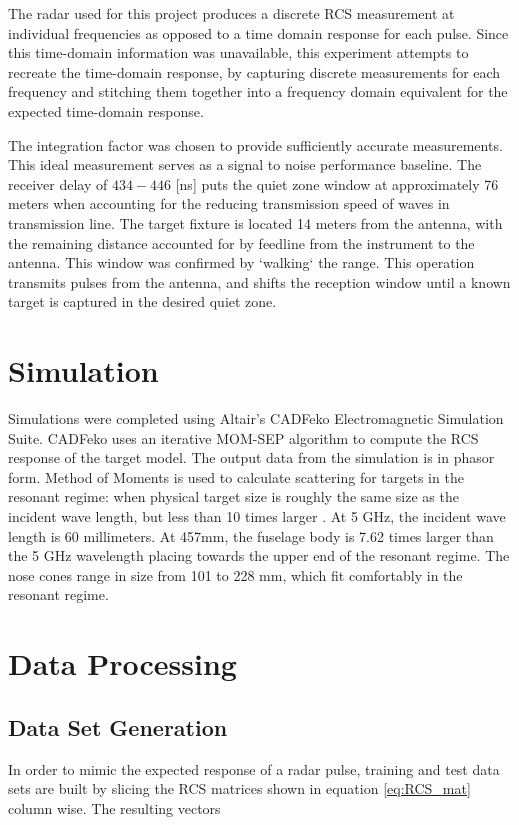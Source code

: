 
  The radar used for this project produces a discrete RCS measurement at individual frequencies as opposed to a time domain response for each pulse. Since this time-domain information was unavailable, this experiment attempts to recreate the time-domain response, by capturing discrete measurements for each frequency and stitching them together into a frequency domain equivalent for the expected time-domain response.

  The integration factor was chosen to provide sufficiently accurate measurements. This ideal measurement serves as a signal to noise performance baseline. The receiver delay of $434-446$ [ns] puts the quiet zone window at approximately 76 meters when accounting for the reducing transmission speed of waves in transmission line. The target fixture is located 14 meters from the antenna, with the remaining distance accounted for by feedline from the instrument to the antenna. This window was confirmed by `walking` the range. This operation transmits pulses from the antenna, and shifts the reception window until a known target is captured in the desired quiet zone.

\section{Simulation}

  Simulations were completed using Altair's CADFeko Electromagnetic Simulation Suite. CADFeko uses an iterative \gls{MOM-SEP} algorithm to compute the RCS response of the target model. The output data from the simulation is in phasor form. Method of Moments is used to calculate scattering for targets in the resonant regime:  when physical target size is roughly the same size as the incident wave length, but less than 10 times larger \cite{Knott}. At 5 GHz, the incident wave length is 60 millimeters. At 457mm, the fuselage body is 7.62 times larger than the 5 GHz wavelength placing towards the upper end of the resonant regime. The nose cones range in size from 101 to 228 mm, which fit comfortably in the resonant regime.

\section{Data Processing}

  \subsection{Data Set Generation}
    In order to mimic the expected response of a radar pulse, training and test data sets are built by slicing the RCS matrices shown in equation \ref{eq:RCS_mat} column wise. The resulting vectors

